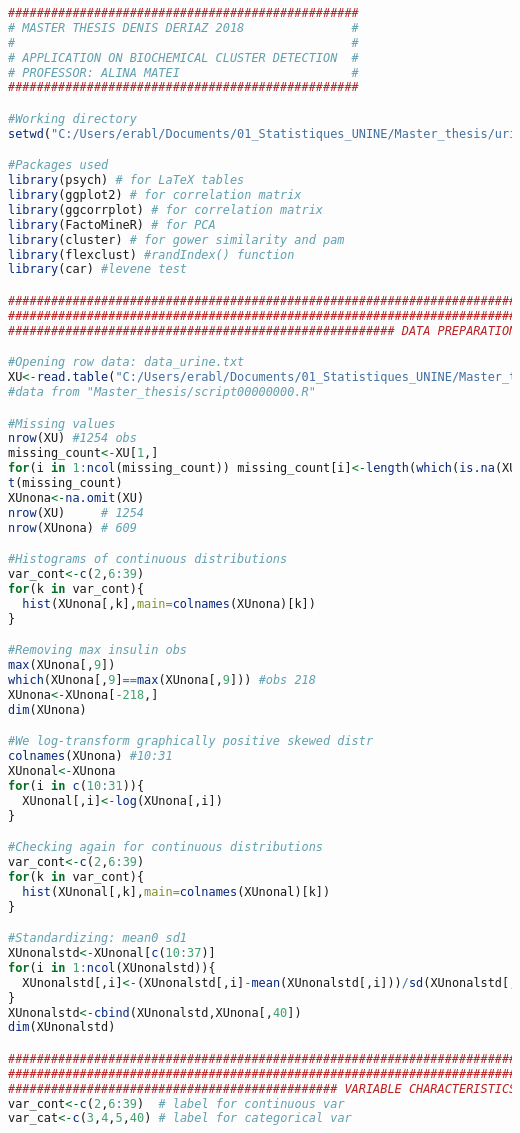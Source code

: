 \documentclass[a4paper]{book}
\begin{document}
\begin{lstlisting}[language=R]
#################################################
# MASTER THESIS DENIS DERIAZ 2018               #
#                                               #
# APPLICATION ON BIOCHEMICAL CLUSTER DETECTION  #
# PROFESSOR: ALINA MATEI                        #
#################################################

#Working directory
setwd("C:/Users/erabl/Documents/01_Statistiques_UNINE/Master_thesis/urine_analysis20181005")

#Packages used
library(psych) # for LaTeX tables
library(ggplot2) # for correlation matrix
library(ggcorrplot) # for correlation matrix
library(FactoMineR) # for PCA
library(cluster) # for gower similarity and pam
library(flexclust) #randIndex() function
library(car) #levene test

#######################################################################
#######################################################################
###################################################### DATA PREPARATION

#Opening row data: data_urine.txt
XU<-read.table("C:/Users/erabl/Documents/01_Statistiques_UNINE/Master_thesis/data/20181008_SKIPOGH/data_urine1.txt")
#data from "Master_thesis/script00000000.R"

#Missing values
nrow(XU) #1254 obs
missing_count<-XU[1,]
for(i in 1:ncol(missing_count)) missing_count[i]<-length(which(is.na(XU[,i])==T))
t(missing_count)
XUnona<-na.omit(XU)
nrow(XU)     # 1254
nrow(XUnona) # 609

#Histograms of continuous distributions
var_cont<-c(2,6:39)
for(k in var_cont){
  hist(XUnona[,k],main=colnames(XUnona)[k])
}

#Removing max insulin obs
max(XUnona[,9])
which(XUnona[,9]==max(XUnona[,9])) #obs 218
XUnona<-XUnona[-218,]
dim(XUnona)

#We log-transform graphically positive skewed distr
colnames(XUnona) #10:31
XUnonal<-XUnona
for(i in c(10:31)){
  XUnonal[,i]<-log(XUnona[,i])
}

#Checking again for continuous distributions
var_cont<-c(2,6:39)
for(k in var_cont){
  hist(XUnonal[,k],main=colnames(XUnonal)[k])
}

#Standardizing: mean0 sd1
XUnonalstd<-XUnonal[c(10:37)]
for(i in 1:ncol(XUnonalstd)){
  XUnonalstd[,i]<-(XUnonalstd[,i]-mean(XUnonalstd[,i]))/sd(XUnonalstd[,i])
}
XUnonalstd<-cbind(XUnonalstd,XUnona[,40])
dim(XUnonalstd)

#######################################################################
#######################################################################
############################################## VARIABLE CHARACTERISTICS
var_cont<-c(2,6:39)  # label for continuous var
var_cat<-c(3,4,5,40) # label for categorical var


\end{lstlisting}
\end{document}
